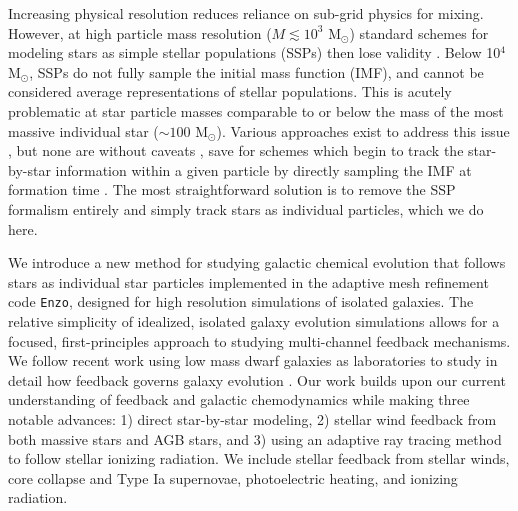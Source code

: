 \documentclass[twocolumn]{aastex61}
\begin{document}
Increasing physical resolution reduces reliance on sub-grid physics for mixing.  However, at high particle mass resolution ($M \lesssim 10^3$ M$_{\odot}$) standard schemes for modeling stars as simple stellar populations (SSPs) then lose validity  \citep[as studied in detail by][]{Revaz2016}. Below 10$^4$ M$_{\odot}$, SSPs do not fully sample the initial mass function (IMF), and cannot be considered average representations of stellar populations. This is acutely problematic at star particle masses comparable to or below the mass of the most massive individual star ($\sim 100$ M$_{\odot}$). Various approaches exist to address this issue \citep[e.g.][]{Kobayashi2000,WeidnerKroupa2004,Pflamm-AltenburgKroupa2006,RevazJablonka2012,Kroupa2013,Rosdahl2015,Su2017b}, but none are without caveats \citep{Revaz2016}, save for schemes which begin to track the star-by-star information within a given particle by directly sampling the IMF at formation time \citep[e.g.][]{Hu2017}.  The most straightforward
solution is to remove the SSP formalism entirely and simply track stars as individual particles,
    which we do here.

We introduce a new method for studying galactic chemical evolution that follows stars as individual star particles implemented in the adaptive mesh refinement code \texttt{Enzo}, designed for high resolution simulations of isolated galaxies. The relative simplicity of idealized, isolated galaxy evolution simulations allows for a focused, first-principles approach to studying multi-channel feedback mechanisms. We follow recent work using low mass dwarf galaxies as laboratories to study in detail how feedback governs galaxy evolution \citep{Forbes2016,Hu2016,Hu2017}.
Our work builds upon our current understanding of feedback and galactic chemodynamics while making three notable advances: 1) direct star-by-star modeling, 2) stellar wind feedback from both massive stars and AGB stars, and 3) using an adaptive ray tracing method to follow stellar ionizing radiation. 
  We include stellar feedback from stellar winds, core collapse and Type Ia supernovae,    
  photoelectric heating, and ionizing radiation.
\end{document}
